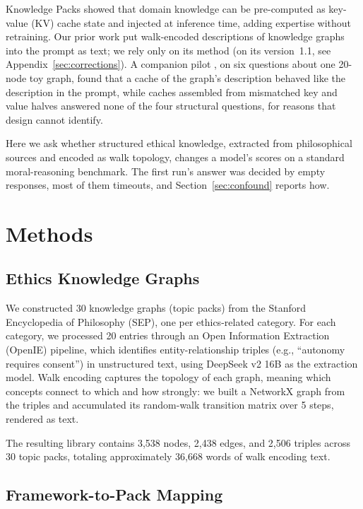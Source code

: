 \documentclass[11pt,a4paper]{article}
\begin{document}
Knowledge Packs \citep{pustovit2026knowledge} showed that domain knowledge can be pre-computed as key-value (KV) cache state and injected at inference time, adding expertise without retraining. Our prior work \citep{nexus2026topology} put walk-encoded descriptions of knowledge graphs into the prompt as text; we rely only on its method (on its version~1.1, see Appendix~\ref{sec:corrections}). A companion pilot \citep{nexus2026kv}, on six questions about one 20-node toy graph, found that a cache of the graph's description behaved like the description in the prompt, while caches assembled from mismatched key and value halves answered none of the four structural questions, for reasons that design cannot identify.

Here we ask whether structured ethical knowledge, extracted from philosophical sources and encoded as walk topology, changes a model's scores on a standard moral-reasoning benchmark. The first run's answer was decided by empty responses, most of them timeouts, and Section~\ref{sec:confound} reports how.

\section{Methods}

\subsection{Ethics Knowledge Graphs}

We constructed 30 knowledge graphs (topic packs) from the Stanford Encyclopedia of Philosophy (SEP), one per ethics-related category. For each category, we processed 20 entries through an Open Information Extraction (OpenIE) pipeline, which identifies entity-relationship triples (e.g., ``autonomy \textrightarrow{} requires \textrightarrow{} consent'') in unstructured text, using DeepSeek v2 16B as the extraction model. Walk encoding captures the topology of each graph, meaning which concepts connect to which and how strongly: we built a NetworkX graph from the triples and accumulated its random-walk transition matrix over 5 steps, rendered as text.

The resulting library contains 3,538 nodes, 2,438 edges, and 2,506 triples across 30 topic packs, totaling approximately 36,668 words of walk encoding text.

\subsection{Framework-to-Pack Mapping}
\end{document}

